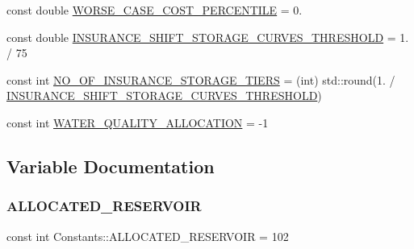 \begin{DoxyCompactItemize}
const double \mbox{\hyperlink{namespaceConstants_af0f5a11d2e7941b6c85ea1b8034d3996}{W\+O\+R\+S\+E\+\_\+\+C\+A\+S\+E\+\_\+\+C\+O\+S\+T\+\_\+\+P\+E\+R\+C\+E\+N\+T\+I\+LE}} = 0.
\item 
const double \mbox{\hyperlink{namespaceConstants_a40ab8dd088d886af9b5795c6b9db22ca}{I\+N\+S\+U\+R\+A\+N\+C\+E\+\_\+\+S\+H\+I\+F\+T\+\_\+\+S\+T\+O\+R\+A\+G\+E\+\_\+\+C\+U\+R\+V\+E\+S\+\_\+\+T\+H\+R\+E\+S\+H\+O\+LD}} = 1. / 75
\item 
const int \mbox{\hyperlink{namespaceConstants_ae6ed2a07e84e5c0280325e2dffd3ceca}{N\+O\+\_\+\+O\+F\+\_\+\+I\+N\+S\+U\+R\+A\+N\+C\+E\+\_\+\+S\+T\+O\+R\+A\+G\+E\+\_\+\+T\+I\+E\+RS}} = (int) std\+::round(1. / \mbox{\hyperlink{namespaceConstants_a40ab8dd088d886af9b5795c6b9db22ca}{I\+N\+S\+U\+R\+A\+N\+C\+E\+\_\+\+S\+H\+I\+F\+T\+\_\+\+S\+T\+O\+R\+A\+G\+E\+\_\+\+C\+U\+R\+V\+E\+S\+\_\+\+T\+H\+R\+E\+S\+H\+O\+LD}})
\item 
const int \mbox{\hyperlink{namespaceConstants_a35b1f837d5193288c3de6cb4d72f113c}{W\+A\+T\+E\+R\+\_\+\+Q\+U\+A\+L\+I\+T\+Y\+\_\+\+A\+L\+L\+O\+C\+A\+T\+I\+ON}} = -\/1
\end{DoxyCompactItemize}


\subsection{Variable Documentation}
\mbox{\label{namespaceConstants_a2769e2f1bc080457c78297402e78c8d1}} 
\subsubsection{\texorpdfstring{A\+L\+L\+O\+C\+A\+T\+E\+D\+\_\+\+R\+E\+S\+E\+R\+V\+O\+IR}{ALLOCATED\_RESERVOIR}}
{\footnotesize\ttfamily const int Constants\+::\+A\+L\+L\+O\+C\+A\+T\+E\+D\+\_\+\+R\+E\+S\+E\+R\+V\+O\+IR = 102}

\mbox{\label{namespaceConstants_a6d0d721f1c6d8807ddeb8b80eb165108}} 
